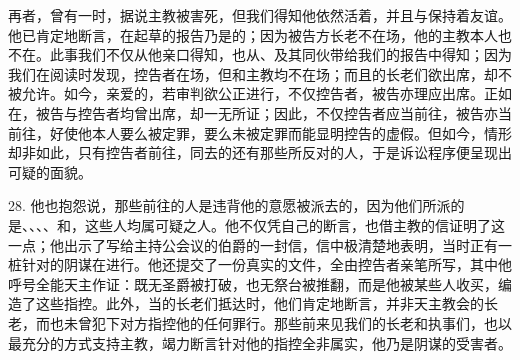 再者，曾有一时，据说主教被害死，但我们得知他依然活着，并且与保持着友谊。他已肯定地断言，在起草的报告乃是的；因为被告方长老不在场，他的主教本人也不在。此事我们不仅从他亲口得知，也从、及其同伙带给我们的报告中得知；因为我们在阅读时发现，控告者在场，但和主教均不在场；而且的长老们欲出席，却不被允许。如今，亲爱的，若审判欲公正进行，不仅控告者，被告亦理应出席。正如在，被告与控告者均曾出席，却一无所证；因此，不仅控告者应当前往，被告亦当前往，好使他本人要么被定罪，要么未被定罪而能显明控告的虚假。但如今，情形却非如此，只有控告者前往，同去的还有那些所反对的人，于是诉讼程序便呈现出可疑的面貌。\par

28. 他也抱怨说，那些前往的人是违背他的意愿被派去的，因为他们所派的是、、、、和，这些人均属可疑之人。他不仅凭自己的断言，也借主教的信证明了这一点；他出示了写给主持公会议的伯爵的一封信，信中极清楚地表明，当时正有一桩针对的阴谋在进行。他还提交了一份真实的文件，全由控告者亲笔所写，其中他呼号全能天主作证：既无圣爵被打破，也无祭台被推翻，而是他被某些人收买，编造了这些指控。此外，当的长老们抵达时，他们肯定地断言，并非天主教会的长老，而也未曾犯下对方指控他的任何罪行。那些前来见我们的长老和执事们，也以最充分的方式支持主教，竭力断言针对他的指控全非属实，他乃是阴谋的受害者。\par


